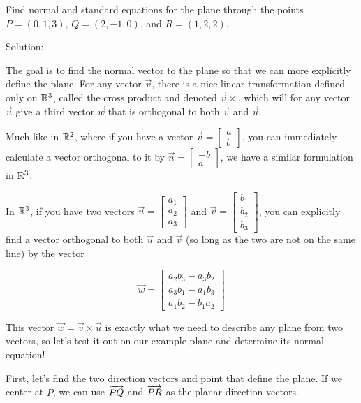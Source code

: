 \documentclass{ximera}
\begin{document}
\begin{example}\label{exa:normal-from-three-points}

    Find normal and standard equations for the plane through the points
    $P = (0,1,3)$, $Q=(2,-1,0)$, and $R=(1,2,2)$.

    Solution:

    The goal is to find the normal vector to the plane so that we can more explicitly define the plane. For any vector $\vec{v}$, there is a nice linear transformation defined only on $\mathbb{R}^3$, called the cross product and denoted $\vec{v}\times$, which will for any vector $\vec{u}$ give a third vector $\vec{w}$ that is orthogonal to both $\vec{v}$ and $\vec{u}$.

    Much like in $\mathbb{R}^2$, where if you have a vector $\vec{v}=\begin{bmatrix}
      a\\b
    \end{bmatrix}$, you can immediately calculate a vector orthogonal to it by $\vec{n}=\begin{bmatrix}
      -b\\a
    \end{bmatrix}$, we have a similar formulation in $\mathbb{R}^3$.

    In $\mathbb{R}^3$, if you have two vectors $\vec{u}=\begin{bmatrix}
      a_1\\a_2\\a_3
    \end{bmatrix}$ and $\vec{v}=\begin{bmatrix}
      b_1\\b_2\\b_3
    \end{bmatrix}$, you can explicitly find a vector orthogonal to both $\vec{u}$ and $\vec{v}$ (so long as the two are not on the same line) by the vector

    $$\vec{w}=\begin{bmatrix}
      a_2b_3-a_3b_2\\a_3b_1-a_1b_3\\a_1b_2-b_1a_2
    \end{bmatrix}$$

    This vector $\vec{w}=\vec{v}\times\vec{u}$ is exactly what we need to describe any plane from two vectors, so let's test it out on our example plane and determine its normal equation!

    First, let's find the two direction vectors and point that define the plane. If we center at $P$, we can use  $\overrightarrow{PQ}$ and $\overrightarrow{PR}$ as the planar direction vectors. 


\end{example}
\end{document}
